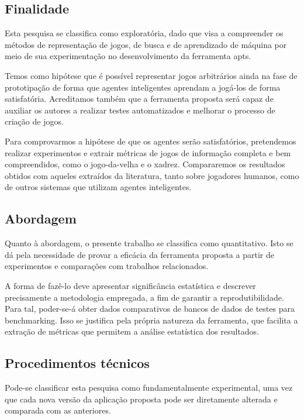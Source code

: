 \documentclass[12pt]{article}
\begin{document}
\subsection{Finalidade}

Esta pesquisa se classifica como exploratória, dado que visa a compreender os métodos de representação de jogos, de busca e de aprendizado de máquina por meio de sua experimentação no desenvolvimento da ferramenta \gls{apts}.

Temos como hipótese que é possível representar jogos arbitrários ainda na fase de prototipação de forma que agentes inteligentes aprendam a jogá-los de forma satisfatória.
Acreditamos também que a ferramenta proposta será capaz de auxiliar os autores a realizar testes automatizados e melhorar o processo de criação de jogos.

Para comprovarmos a hipótese de que os agentes serão satisfatórios, pretendemos realizar experimentos e extrair métricas de jogos de informação completa e bem compreendidos, como o jogo-da-velha e o xadrez.
Compararemos os resultados obtidos com aqueles extraídos da literatura, tanto sobre jogadores humanos, como de outros sistemas que utilizam agentes inteligentes.

\subsection{Abordagem}

Quanto à abordagem, o presente trabalho se classifica como quantitativo.
Isto se dá pela necessidade de provar a eficácia da ferramenta proposta a partir de experimentos e comparações com trabalhos relacionados.

A forma de fazê-lo deve apresentar significância estatística e descrever precisamente a metodologia empregada, a fim de garantir a reprodutibilidade.
Para tal, poder-se-á obter dados comparativos de bancos de dados de testes para benchmarking.
Isso se justifica pela própria natureza da ferramenta, que facilita a extração de métricas que permitem a análise estatística dos resultados.

\subsection{Procedimentos técnicos}

Pode-se classificar esta pesquisa como fundamentalmente experimental, uma vez que cada nova versão da aplicação proposta pode ser diretamente alterada e comparada com as anteriores.
\end{document}
